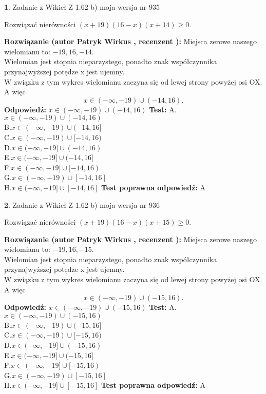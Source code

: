 \documentclass[12pt, a4paper]{article}
\theoremstyle{definition} %
\newtheorem{zad}{}
\newcommand{\zadStart}[1]{\begin{zad}#1\newline}
\newcommand{\zadStop}{\end{zad}}
\newcommand{\rozwStart}[2]{\noindent \textbf{Rozwiązanie (autor #1 , recenzent #2): }\newline}
\newcommand{\rozwStop}{\newline}
\newcommand{\odpStart}{\noindent \textbf{Odpowiedź:}\newline}
\newcommand{\odpStop}{\newline}
\newcommand{\testStart}{\noindent \textbf{Test:}\newline}
\newcommand{\testStop}{\newline}
\newcommand{\kluczStart}{\noindent \textbf{Test poprawna odpowiedź:}\newline}
\newcommand{\kluczStop}{\newline}
\begin{document}
\zadStart{Zadanie z Wikieł Z 1.62 b) moja wersja nr 935}

Rozwiązać nierówności $(x+19)(16-x)(x+14)\ge0$.
\zadStop
\rozwStart{Patryk Wirkus}{}
Miejsca zerowe naszego wielomianu to: $-19, 16, -14$.\\
Wielomian jest stopnia nieparzystego, ponadto znak współczynnika przy\linebreak najwyższej potędze x jest ujemny.\\ W związku z tym wykres wielomianu zaczyna się od lewej strony powyżej osi OX. A więc $$x \in (-\infty,-19) \cup (-14,16).$$
\rozwStop
\odpStart
$x \in (-\infty,-19) \cup (-14,16)$
\odpStop
\testStart
A.$x \in (-\infty,-19) \cup (-14,16)$\\
B.$x \in (-\infty,-19) \cup (-14,16]$\\
C.$x \in (-\infty,-19) \cup [-14,16)$\\
D.$x \in (-\infty,-19] \cup (-14,16)$\\
E.$x \in (-\infty,-19] \cup (-14,16]$\\
F.$x \in (-\infty,-19] \cup [-14,16)$\\
G.$x \in (-\infty,-19) \cup [-14,16]$\\
H.$x \in (-\infty,-19] \cup [-14,16]$
\testStop
\kluczStart
A
\kluczStop



\zadStart{Zadanie z Wikieł Z 1.62 b) moja wersja nr 936}

Rozwiązać nierówności $(x+19)(16-x)(x+15)\ge0$.
\zadStop
\rozwStart{Patryk Wirkus}{}
Miejsca zerowe naszego wielomianu to: $-19, 16, -15$.\\
Wielomian jest stopnia nieparzystego, ponadto znak współczynnika przy\linebreak najwyższej potędze x jest ujemny.\\ W związku z tym wykres wielomianu zaczyna się od lewej strony powyżej osi OX. A więc $$x \in (-\infty,-19) \cup (-15,16).$$
\rozwStop
\odpStart
$x \in (-\infty,-19) \cup (-15,16)$
\odpStop
\testStart
A.$x \in (-\infty,-19) \cup (-15,16)$\\
B.$x \in (-\infty,-19) \cup (-15,16]$\\
C.$x \in (-\infty,-19) \cup [-15,16)$\\
D.$x \in (-\infty,-19] \cup (-15,16)$\\
E.$x \in (-\infty,-19] \cup (-15,16]$\\
F.$x \in (-\infty,-19] \cup [-15,16)$\\
G.$x \in (-\infty,-19) \cup [-15,16]$\\
H.$x \in (-\infty,-19] \cup [-15,16]$
\testStop
\kluczStart
A
\kluczStop
\end{document}
